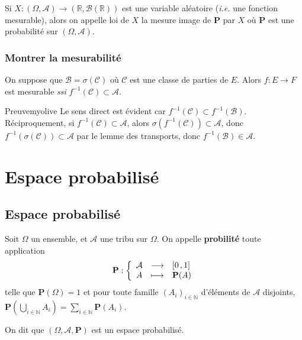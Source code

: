     Si $X : (\Omega, \mathcal{A}) \to (\mathbb{R}, \mathcal{B}(\mathbb{R}))$ est une variable aléatoire (\textit{i.e.} une fonction mesurable), alors on appelle loi de $X$ la mesure image de $\mathbf{P}$ par $X$ où $\mathbf{P}$ est une probabilité sur $(\Omega, \mathcal{A})$.

    \subsubsection{Montrer la mesurabilité}

    \begin{prop}{}{}
        On suppose que $\mathcal{B} = \sigma(\mathcal{C})$ où $\mathcal{C}$ est une classe de parties de $E$. Alors $f : E \to F$ est mesurable \textit{ssi} $f^{-1}(\mathcal{C}) \subset \mathcal{A}$.
    \end{prop}

    \begin{demo}{Preuve}{myolive}
        Le sens direct est évident car $f^{-1}(\mathcal{C}) \subset f^{-1}(\mathcal{B})$. Réciproquement, si $f^{-1}(\mathcal{C}) \subset \mathcal{A}$, alors $\sigma(f^{-1}(\mathcal{C})) \subset \mathcal{A}$, donc $f^{-1}(\sigma(\mathcal{C})) \subset \mathcal{A}$ par le lemme des transports, donc $f^{-1}(\mathcal{B}) \in \mathcal{A}$.
    \end{demo}



\section{Espace probabilisé}

    \subsection{Espace probabilisé}

    \begin{defi}{}{}
        Soit $\Omega$ un ensemble, et $\mathcal{A}$ une tribu sur $\Omega$. On appelle \textbf{probilité} toute application 
        \[ \fonction{\mathbf{P}}{\mathcal{A}}{\intervalleFF{0}{1}}{A}{\mathbf{P}(A)} \]   
        telle que $\mathbf{P}(\Omega) = 1$ et pour toute famille $(A_i)_{i \in \mathbb{N}}$ d’éléments de $\mathcal{A}$ disjoints, $\mathbf{P}(\bigcup_{i \in \mathbb{N}} A_i) = \sum_{i \in \mathbb{N}} \mathbf{P}(A_i)$. 

        On dit que $(\Omega, \mathcal{A}, \mathbf{P})$ est un espace probabilisé. 
    \end{defi}

